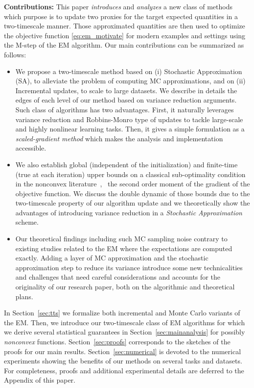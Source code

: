 \documentclass[journal, 11pt]{IEEEtran}
\begin{document}
\vspace{0.08in}
\noindent \textbf{Contributions:} This paper \textit{introduces} and \textit{analyzes} a new class of methods which purpose is to update two proxies for the target expected quantities in a two-timescale manner. 
Those approximated quantities are then used to optimize the objective function \eqref{eq:em_motivate} for modern examples and settings using the \textsf{M-step} of the EM algorithm.
Our main contributions can be summarized as follows:
\begin{itemize}
\item We propose a two-timescale method based on \textsf{(i)} Stochastic Approximation (SA), to alleviate the problem of computing MC approximations, and on \textsf{(ii)} Incremental updates, to scale to large datasets. We describe in details the edges of each level of our method based on variance reduction arguments. Such class of algorithms has two advantages. First, it naturally leverages variance reduction and Robbins-Monro type of updates to tackle large-scale and highly nonlinear learning tasks. Then, it gives a simple formulation as a \textit{scaled-gradient method} which makes the analysis and implementation accessible.
\item We also establish global (independent of the initialization) and finite-time (true at each iteration) upper bounds on a classical sub-optimality condition in the nonconvex literature~\cite{jain2017non, ghadimi2013stochastic}, \ie\ the second order moment of the gradient of the objective function. 
We discuss the double dynamic of those bounds due to the two-timescale property of our algorithm update and we theoretically show the advantages of introducing variance reduction in a \emph{Stochastic Approximation}~\cite{robbins1951stochastic} scheme.
\item Our theoretical findings including such MC sampling noise contrary to existing studies related to the EM where the expectations are computed exactly. 
Adding a layer of MC approximation and the stochastic approximation step to reduce its variance introduce some new technicalities and challenges that need careful considerations and accounts for the originality of our research paper, both on the algorithmic and theoretical plans.
\end{itemize}
In Section~\ref{sec:tts} we formalize both incremental and Monte Carlo variants of the EM. 
Then, we introduce our two-timescale class of EM algorithms for which we derive several statistical guarantees in Section~\ref{sec:mainanalysis} for possibly \textit{nonconvex} functions.
Section~\ref{sec:proofs} corresponds to the sketches of the proofs for our main results.
Section~\ref{sec:numerical} is devoted to the numerical experiments showing the benefits of our methods on several tasks and datasets.
For completeness, proofs and additional experimental details are deferred to the Appendix of this paper.
\end{document}
